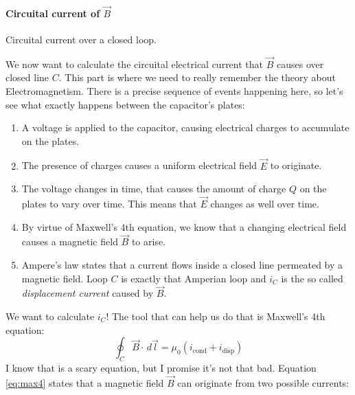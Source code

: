 \paragraph[Problem 4]{Circuital current of $\vec{B}$}
\label{par:subp4}
%
\begin{marginfigure}
    \centering
    
    \caption[Circuital current over a closed loop.]{Circuital current over a closed loop.}
    \label{fig:circuital}
\end{marginfigure}
%
We now want to calculate the circuital electrical current that $\vec{B}$ causes
over closed line $C$. This part is where we need to really remember the theory about
Electromagnetism. There is a precise sequence of events happening here, so let's
see what exactly happens between the capacitor's plates:
\begin{enumerate}
    \item A voltage is applied to the capacitor, causing electrical charges to accumulate on the
        plates.
    \item The presence of charges causes a uniform electrical field $\vec{E}$ to
        originate.
    \item The voltage changes in time, that causes the amount of charge $Q$ on the plates to
        vary over time. This means that $\vec{E}$ changes as well over time.
    \item By virtue of Maxwell's 4th equation, we know that a changing electrical field
        causes a magnetic field $\vec{B}$ to arise.
    \item Ampere's law states that a current flows inside a closed
        line permeated by a magnetic field.
        Loop $C$ is exactly that Amperian loop and $i_C$ is the so called
        \textit{displacement current} caused by $\vec{B}$.
\end{enumerate}
We want to
calculate $i_C$!
The tool that can help us do that is Maxwell's 4th equation:
\begin{equation}
\label{eq:max4}
    \oint_C \vec{B} \cdot \,d \vec{l} = \mu_0 (i_{\text{cond}} + i_{\text{disp}})
\end{equation}
I know that is a scary equation, but I promise it's not that bad.
Equation \ref{eq:max4} states that
a magnetic field $\vec{B}$ can originate from two possible currents:
